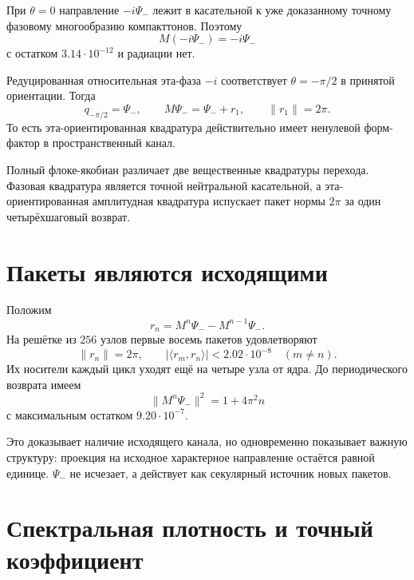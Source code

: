 При $\theta=0$ направление $-i\Psi_-$ лежит в касательной к уже
доказанному точному фазовому многообразию компакттонов. Поэтому
\begin{equation}
 M(-i\Psi_-)=-i\Psi_-
\end{equation}
с остатком $3.14\cdot10^{-12}$ и радиации нет.

Редуцированная относительная эта-фаза $-i$ соответствует
$\theta=-\pi/2$ в принятой ориентации. Тогда
\begin{equation}
 q_{-\pi/2}=\Psi_-,
 \qquad
 M\Psi_- = \Psi_-+r_1,
 \qquad
 \|r_1\|=2\pi.
 \label{eq:v6-character-eta-radiation-packet}
\end{equation}
То есть эта-ориентированная квадратура действительно имеет ненулевой
форм-фактор в пространственный канал.

\begin{proposition}
Полный флоке-якобиан различает две вещественные квадратуры перехода.
Фазовая квадратура является точной нейтральной касательной, а
эта-ориентированная амплитудная квадратура испускает пакет нормы $2\pi$
за один четырёхшаговый возврат.
\end{proposition}

\section{Пакеты являются исходящими}

Положим
\begin{equation}
 r_n=M^n\Psi_- - M^{n-1}\Psi_-.
\end{equation}
На решётке из $256$ узлов первые восемь пакетов удовлетворяют
\begin{equation}
 \|r_n\|=2\pi,
 \qquad
 |\langle r_m,r_n\rangle|<2.02\cdot10^{-8}
 \quad(m\ne n).
 \label{eq:v6-character-outgoing-orthogonal-packets}
\end{equation}
Их носители каждый цикл уходят ещё на четыре узла от ядра. До
периодического возврата имеем
\begin{equation}
 \|M^n\Psi_-\|^2
 =1+4\pi^2n
 \label{eq:v6-character-secular-emission}
\end{equation}
с максимальным остатком $9.20\cdot10^{-7}$.

Это доказывает наличие исходящего канала, но одновременно показывает
важную структуру: проекция на исходное характерное направление остаётся
равной единице. $\Psi_-$ не исчезает, а действует как секулярный источник
новых пакетов.

\section{Спектральная плотность и точный коэффициент}

